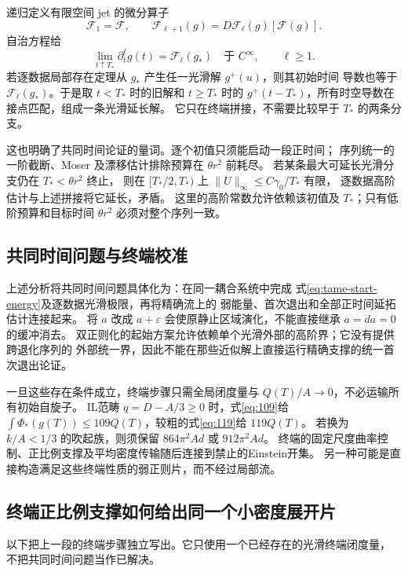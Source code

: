 \documentclass[UTF8,a4paper,11pt,fontset=fandol]{ctexart}
\numberwithin{equation}{section}
\theoremstyle{definition}
\begin{document}
递归定义有限空间 jet 的微分算子
\[
\mathcal F_1=\mathcal F,\qquad
\mathcal F_{\ell+1}(g)=D\mathcal F_\ell(g)[\mathcal F(g)].
\]
自治方程给
\begin{equation}\label{eq:time-jet-splice}
\lim_{t\uparrow T_*}\partial_t^\ell g(t)=\mathcal F_\ell(g_*)
\quad\text{于 }C^\infty,\qquad \ell\ge1.
\end{equation}
若逐数据局部存在定理从 $g_*$ 产生任一光滑解 $g^+(u)$，则其初始时间
导数也等于 $\mathcal F_\ell(g_*)$。于是取 $t<T_*$ 时的旧解和
$t\ge T_*$ 时的 $g^+(t-T_*)$，所有时空导数在接点匹配，组成一条光滑延长解。
它只在终端拼接，不需要比较早于 $T_*$ 的两条分支。

这也明确了共同时间论证的量词。逐个初值只须能启动一段正时间；
序列统一的一阶截断、Moser 及漂移估计排除预算在 $\theta r^2$ 前耗尽。
若某条最大可延长光滑分支仍在 $T_*<\theta r^2$ 终止，
则在 $[T_*/2,T_*)$ 上 $\|U\|_\infty\le C\gamma_0/T_*$ 有限，
逐数据高阶估计与上述拼接将它延长，矛盾。
这里的高阶常数允许依赖该初值及 $T_*$；只有低阶预算和目标时间
$\theta r^2$ 必须对整个序列一致。

\subsection{共同时间问题与终端校准}
上述分析将共同时间问题具体化为：在同一耦合系统中完成
式\eqref{eq:tame-start-energy}及逐数据光滑极限，再将精确流上的
弱能量、首次退出和全部正时间延拓估计连接起来。
将 $a$ 改成 $a+\varepsilon$ 会使原静止区域演化，不能直接继承 $a=da=0$ 的缓冲消去。
双正则化的起始方案允许依赖单个光滑外部的高阶界；它没有提供跨退化序列的
外部统一界，因此不能在那些近似解上直接运行精确支撑的统一首次退出论证。

一旦这些存在条件成立，终端步骤只需全局闭度量与
$Q(T)/A\to0$，不必运输所有初始自旋子。
IL范畴 $q=D-A/3\ge0$ 时，式\eqref{eq:109}给
$\int\Phi_*(g(T))\le109Q(T)$，较粗的式\eqref{eq:119}给 $119Q(T)$。
若换为 $k/A<1/3$ 的吹起族，则须保留 $864\pi^2Ad$ 或 $912\pi^2Ad$。
终端的固定尺度曲率控制、正比例支撑及平均密度传输随后连接到禁止的Einstein开集。
另一种可能是直接构造满足这些终端性质的弱正则片，而不经过局部流。

\subsection{终端正比例支撑如何给出同一个小密度展开片}\label{sec:terminal-liouville}
以下把上一段的终端步骤独立写出。它只使用一个已经存在的光滑终端闭度量，
不把共同时间问题当作已解决。
\end{document}
